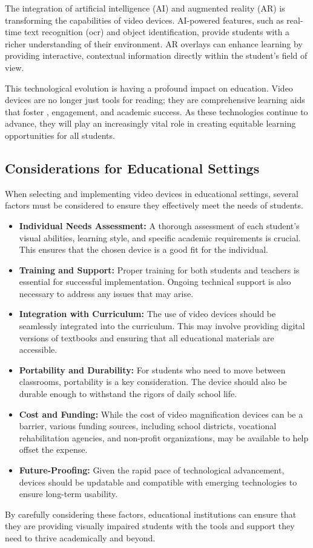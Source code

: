 The integration of artificial intelligence (AI) and augmented reality (AR) is transforming the capabilities of video  devices. AI-powered features, such as real-time text recognition (\gls{ocr}) and object identification, provide students with a richer understanding of their environment. AR overlays can enhance learning by providing interactive, contextual information directly within the student's field of view.\supercite{aimodels2024, msseeingai, envision}

This technological evolution is having a profound impact on education. Video  devices are no longer just tools for reading; they are comprehensive learning aids that foster , engagement, and academic success. As these technologies continue to advance, they will play an increasingly vital role in creating equitable learning opportunities for all students.\supercite{StudentOutcomesResearch, Foley2017AssistiveTechnologyOutcomes}

\subsection{Considerations for Educational Settings}
When selecting and implementing video  devices in educational settings, several factors must be considered to ensure they effectively meet the needs of students.

\begin{itemize}
	\item \textbf{Individual Needs Assessment:} A thorough assessment of each student's visual abilities, learning style, and specific academic requirements is crucial. This ensures that the chosen device is a good fit for the individual.
	\item \textbf{Training and Support:} Proper training for both students and teachers is essential for successful implementation. Ongoing technical support is also necessary to address any issues that may arise.
	\item \textbf{Integration with Curriculum:} The use of video  devices should be seamlessly integrated into the curriculum. This may involve providing digital versions of textbooks and ensuring that all educational materials are accessible.
	\item \textbf{Portability and Durability:} For students who need to move between classrooms, portability is a key consideration. The device should also be durable enough to withstand the rigors of daily school life.
	\item \textbf{Cost and Funding:} While the cost of video magnification devices can be a barrier, various funding sources, including school districts, vocational rehabilitation agencies, and non-profit organizations, may be available to help offset the expense.
	\item \textbf{Future-Proofing:} Given the rapid pace of technological advancement, devices should be updatable and compatible with emerging technologies to ensure long-term usability.
\end{itemize}

By carefully considering these factors, educational institutions can ensure that they are providing visually impaired students with the tools and support they need to thrive academically and beyond.

